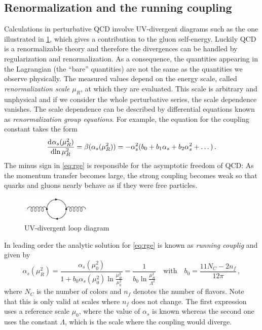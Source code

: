 \subsection{Renormalization and the running coupling}
Calculations in perturbative QCD involve UV-divergent diagrams such as the one illustrated in \cref{fig:loop}, which gives a contribution to the gluon self-energy.
Luckily QCD is a renormalizable theory and therefore the divergences can be handled by regularization and renormalization.
As a consequence, the quantities appearing in the Lagrangian (the \enquote{bare} quantities) are not the same as the quantities we observe physically.
The measured values depend on the energy scale, called \textit {renormalization scale} $\mu_R$, at which they are evaluated.
This scale is arbitrary and unphysical and if we consider the whole perturbative series, the scale dependence vanishes.
The scale dependence can be described by differential equations known as \textit{renormalization group equations}.
For example, the equation for the coupling constant takes the form
%
\begin{equation}
  \dod{ \alpha_{s} ( \mu_R^{2} ) }{ \ln{\mu_R^2} } = \beta(\alpha_s(\mu_R^2)) = - \alpha_s^2 (b_0 + b_1 \alpha_s + b_2 \alpha_s^2 + \dots) \, .
	\label{eq:rge}
\end{equation}
%
The minus sign in \cref{eq:rge} is responsible for the asymptotic freedom of QCD:
As the momentum transfer becomes large, the strong coupling becomes weak so that quarks and gluons nearly behave as if they were free particles.
%
\begin{figure}[]
	\includegraphics[width=0.3\textwidth]{images/loop.pdf}
	\caption{UV-divergent loop diagram}
	\label{fig:loop}
\end{figure}
%

In leading order the analytic solution for \cref{eq:rge} is known as \textit{running couplig} and given by
%
\begin{equation}
	\alpha_s(\mu_R^2) = \frac{\alpha_s(\mu_0^2)}{1 + b_0 \alpha_s(\mu_0^2) \ln \frac{\mu_R^2}{\mu_0^2}} = \frac{1}{b_0 \ln \frac{\mu_R^2}{\Lambda^2}} \quad \text{with} \quad b_0=\frac{11 N_C - 2 n_f}{12 \pi} \, ,
\end{equation}
%
where $N_C$ is the number of colors and $n_f$ denotes the number of flavors.
Note that this is only valid at scales where $n_f$ does not change.
The first expression uses a reference scale $\mu_0$, where the value of $\alpha_s$ is known whereas the second one uses the constant $\Lambda$, which is the scale where the coupling would diverge.
%
